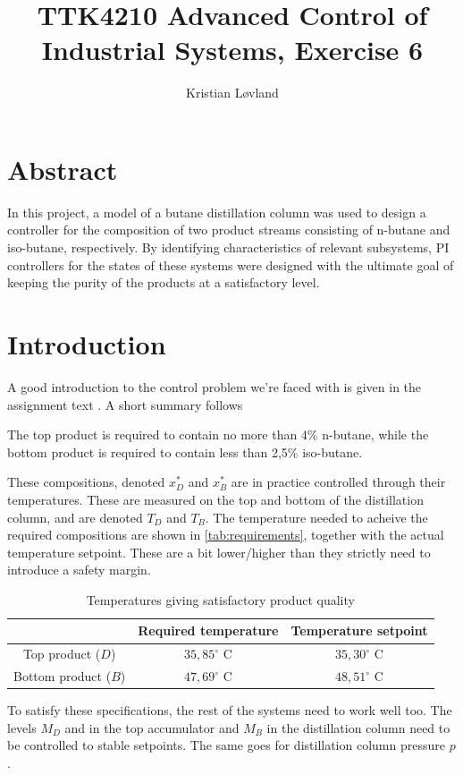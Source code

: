 \documentclass[12pt]{article}
\title{TTK4210 Advanced Control of Industrial Systems, Exercise 6}
\date{}
\author{Kristian Løvland}
\begin{document}
\maketitle
\tableofcontents

\newpage
\section{Abstract}
In this project, a model of a butane distillation column was used to design a controller for the composition of two product streams consisting of n-butane and iso-butane, respectively. By identifying characteristics of relevant subsystems, PI controllers for the states of these systems were designed with the ultimate goal of keeping the purity of the products at a satisfactory level.

\newpage
\section{Introduction}
A good introduction to the control problem we're faced with is given in the assignment text \cite{oppgavetekst}. A short summary follows

The top product is required to contain no more than 4\% n-butane, while the bottom product is required to contain less than 2,5\% iso-butane. 

These compositions, denoted $x_D^*$ and $x_B^*$ are in practice controlled through their temperatures. These are measured on the top and bottom of the distillation column, and are denoted $T_D$ and $T_B$. The temperature needed to acheive the required compositions are shown in \ref{tab:requirements}, together with the actual temperature setpoint. These are a bit lower/higher than they strictly need to introduce a safety margin.

\begin{table}[h]
\centering
\begin{tabular}{c | c | c }
& Required temperature & Temperature setpoint\\ \hline
Top product ($D$) & $35,85^\circ$ C & $35,30^\circ$ C\\
Bottom product ($B$) & $47,69^\circ$ C & $48,51^\circ$ C
\end{tabular}
\caption{Temperatures giving satisfactory product quality}
\end{table}

To satisfy these specifications, the rest of the systems need to work well too. The levels $M_D$ and in the top accumulator and $M_B$ in the distillation column need to be controlled to stable setpoints. The same goes for distillation column pressure $p$.
\end{document}
